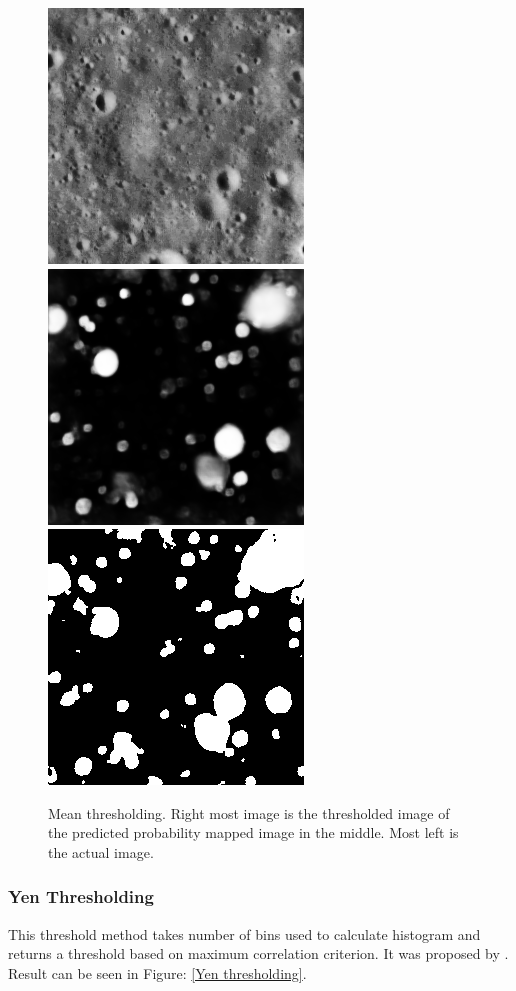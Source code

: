 \documentclass[11pt]{article}
\begin{document}
\begin{figure}[ht!]
	\includegraphics[width=.3\textwidth]{files/results/26.png}\hfill
	\includegraphics[width=.3\textwidth]{files/results/26_predict.png}\hfill
	\includegraphics[width=.3\textwidth]{files/results/mean.png}
	\caption{Mean thresholding. Right most image is the thresholded image of the predicted probability mapped image in the middle. Most left is the actual image.}
	\label{mean_th}
\end{figure}

\subsubsection{Yen Thresholding}
This threshold method takes number of bins used to calculate histogram and returns a threshold based on maximum correlation criterion. It was proposed by \cite{yen1995new}. Result can be seen in Figure: \ref{Yen thresholding}.
\end{document}
